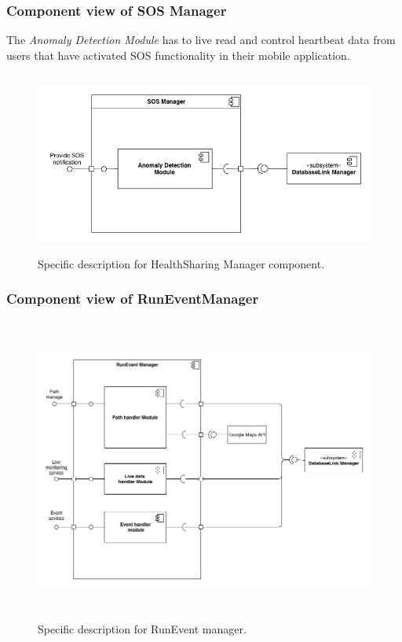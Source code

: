 \documentclass[DD.tex]{subfiles}
\begin{document}
\subsubsection{Component view of SOS Manager}
The \textit{Anomaly Detection Module} has to live read and control heartbeat data from users that have activated SOS functionality in their mobile application.
\begin{figure}[h!]
	\centering
	\includegraphics[height=6.00cm,keepaspectratio]{Figures/SOSManagerComponent}
	\caption{Specific description for HealthSharing Manager component.}
\end{figure}
\newpage


\subsubsection{Component view of RunEventManager}
\begin{figure}[h!]
	\centering
	\includegraphics[height=10.00cm,keepaspectratio]{Figures/RunEventManagerComponent}
	\caption{Specific description for RunEvent manager.}
\end{figure}
\end{document}
